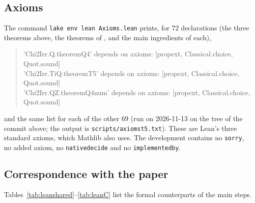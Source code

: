 \documentclass[11pt]{amsart}
\theoremstyle{definition}
\theoremstyle{remark}
\numberwithin{equation}{section}
\newcommand{\lean}[1]{{\def\_{\textunderscore\allowbreak}\texttt{#1}}}
\begin{document}
\subsection{Axioms}
The command \lean{lake env lean Axioms.lean} prints, for $72$ declarations (the three theorems above, the theorems of
\cite{Chi2Paper}, and the main ingredients of each),
\begin{quote}\ttfamily\small
'Chi2Irr.Q.theoremQ4' depends on axioms: [propext, Classical.choice, Quot.sound]\\
'Chi2Irr.TiQ.theoremT5' depends on axioms: [propext, Classical.choice, Quot.sound]\\
'Chi2Irr.QZ.theoremQ4num' depends on axioms: [propext, Classical.choice, Quot.sound]
\end{quote}
and the same list for each of the other $69$ (run on 2026-11-13 on the tree of the commit above; the output is
\lean{scripts\slash{}axioms\_t5.txt}). These are Lean's three standard axioms, which Mathlib also uses. The
development contains no \lean{sorry}, no added axiom, no \lean{native\_decide} and no \lean{implemented\_by}.

\subsection{Correspondence with the paper}
Tables~\ref{tab:leanshared}--\ref{tab:leanC} list the formal counterparts of the main steps.
\end{document}
